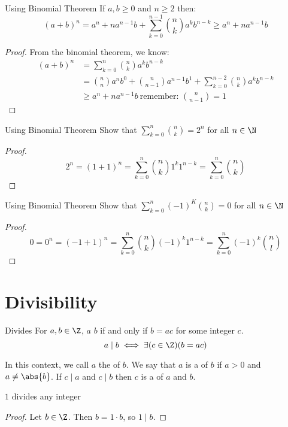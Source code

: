 \documentclass[letterpaper,12pt]{report}
\begin{document}
\begin{exbox}{Using Binomial Theorem}{}
	If $a,b \geq 0$ and $n \geq 2$ then:
	$$(a+b)^n = a^n + na^{n-1}b + \sum_{k=0}^{n-1} {n \choose k} a^k b^{n-k} \geq a^n + na^{n-1}b$$
	\tcblower
	\begin{proof}
		From the binomial theorem, we know:
		\begin{align*}
			(a+b)^n &= \sum_{k=0}^{n} {n \choose k} a^k b^{n-k} \\
			&= {n \choose n} a^n b^0 + {n \choose n-1} a^{n-1} b^{1} + \sum_{k=0}^{n-2} {n \choose k} a^k b^{n-k} \\
			&\geq a^n + na^{n-1}b\ \text{remember: } {n \choose n-1} = 1
		\end{align*}
	\end{proof}
\end{exbox}

\begin{exbox}{Using Binomial Theorem}{}
	Show that $\sum_{k=0}^{n} {n \choose k} = 2^n$ for all $n \in \N$
	\tcblower
	\begin{proof}
		$$2^n = (1+1)^n = \sum_{k=0}^{n} {n \choose k} 1^k 1^{n-k} = \sum_{k=0}^{n} {n \choose k}$$
	\end{proof}
\end{exbox}

\begin{exbox}{Using Binomial Theorem}{}
	Show that $\sum_{k=0}^{n} (-1)^K {n \choose k} = 0$ for all $n \in \N$
	\tcblower
	\begin{proof}
		$$0 = 0^n = (-1 + 1)^n = \sum_{k=0}^n {n \choose k} (-1)^k 1^{n-k} = \sum_{k=0}^{n} (-1)^k {n \choose l}$$
	\end{proof}
\end{exbox}

\section{Divisibility}
\begin{dfnbox}{Divides}{}
	For $a,b \in \Z$, $a$  $b$ if and only if $b=ac$ for some integer $c$.
	\tcblower
	\[ a \mid b \iff \exists(c \in \Z)(b=ac) \]
\end{dfnbox}

In this context, we call $a$ the  of $b$. We say that $a$ is a  of $b$ if $a>0$ and $a \neq \abs{b}$. If $c \mid a$ and $c \mid b$ then $c$ is a  of $a$ and $b$.

\begin{thmbox}{$1$ divides any integer}{}
	\begin{proof}
		Let $b \in \Z$. Then $b = 1 \cdot b$, so $1 \mid b$.
	\end{proof}
\end{thmbox}
\end{document}
